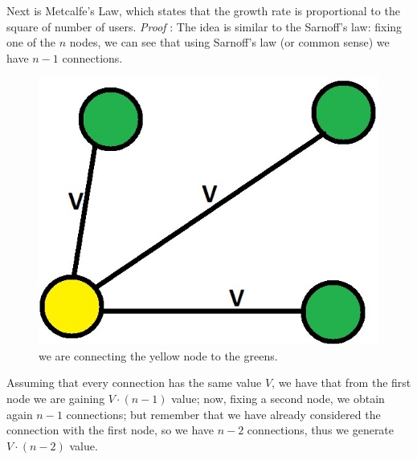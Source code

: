 \documentclass[12pt, a4page]{article}
\begin{document}
Next is Metcalfe's Law, which states that the growth rate is proportional to the square of number of users.\newline
\textit{Proof} : The idea is similar to the Sarnoff's law: fixing one of the $n$ nodes, we can see that using Sarnoff's law (or common sense) we have $n-1$ connections.
\begin{figure}[htp]
\centering
\includegraphics[scale=1.00]{IMAGE2.jpg}
\caption{we are connecting the yellow node to the greens.}
\label{IMAGE2}
\end{figure} \newline
Assuming that every connection has the same value $V$, we have that from the first node we are gaining $V \cdot (n - 1)$ value; now, fixing a second node, we obtain again $n-1$ connections; but remember that we have already considered the connection with the first node, so we have $n-2$ connections, thus we generate $V \cdot (n - 2)$ value. \newline
\end{document}
